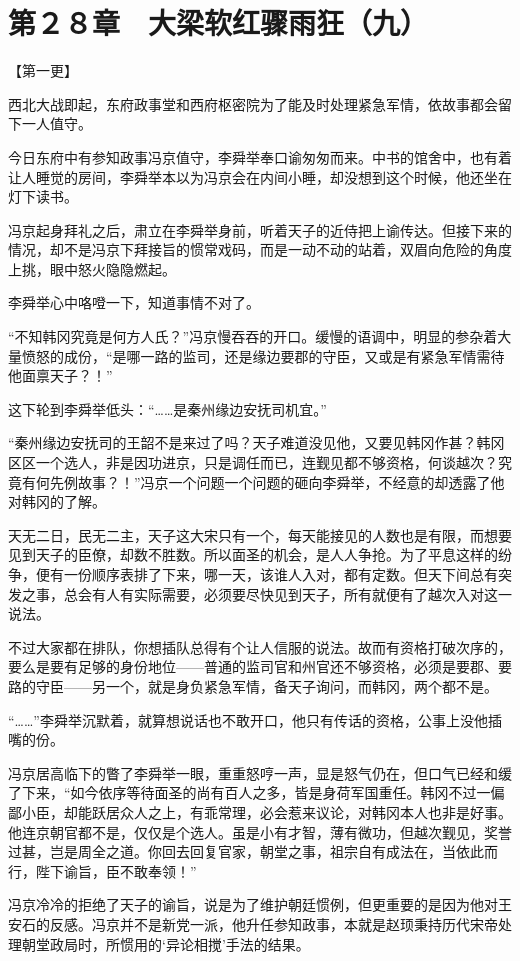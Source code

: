 \section{第２８章　大梁软红骤雨狂（九）}

【第一更】

西北大战即起，东府政事堂和西府枢密院为了能及时处理紧急军情，依故事都会留下一人值守。

今日东府中有参知政事冯京值守，李舜举奉口谕匆匆而来。中书的馆舍中，也有着让人睡觉的房间，李舜举本以为冯京会在内间小睡，却没想到这个时候，他还坐在灯下读书。

冯京起身拜礼之后，肃立在李舜举身前，听着天子的近侍把上谕传达。但接下来的情况，却不是冯京下拜接旨的惯常戏码，而是一动不动的站着，双眉向危险的角度上挑，眼中怒火隐隐燃起。

李舜举心中咯噔一下，知道事情不对了。

“不知韩冈究竟是何方人氏？”冯京慢吞吞的开口。缓慢的语调中，明显的参杂着大量愤怒的成份，“是哪一路的监司，还是缘边要郡的守臣，又或是有紧急军情需待他面禀天子？！”

这下轮到李舜举低头：“……是秦州缘边安抚司机宜。”

“秦州缘边安抚司的王韶不是来过了吗？天子难道没见他，又要见韩冈作甚？韩冈区区一个选人，非是因功进京，只是调任而已，连觐见都不够资格，何谈越次？究竟有何先例故事？！”冯京一个问题一个问题的砸向李舜举，不经意的却透露了他对韩冈的了解。

天无二日，民无二主，天子这大宋只有一个，每天能接见的人数也是有限，而想要见到天子的臣僚，却数不胜数。所以面圣的机会，是人人争抢。为了平息这样的纷争，便有一份顺序表排了下来，哪一天，该谁人入对，都有定数。但天下间总有突发之事，总会有人有实际需要，必须要尽快见到天子，所有就便有了越次入对这一说法。

不过大家都在排队，你想插队总得有个让人信服的说法。故而有资格打破次序的，要么是要有足够的身份地位——普通的监司官和州官还不够资格，必须是要郡、要路的守臣——另一个，就是身负紧急军情，备天子询问，而韩冈，两个都不是。

“……”李舜举沉默着，就算想说话也不敢开口，他只有传话的资格，公事上没他插嘴的份。

冯京居高临下的瞥了李舜举一眼，重重怒哼一声，显是怒气仍在，但口气已经和缓了下来，“如今依序等待面圣的尚有百人之多，皆是身荷军国重任。韩冈不过一偏鄙小臣，却能跃居众人之上，有乖常理，必会惹来议论，对韩冈本人也非是好事。他连京朝官都不是，仅仅是个选人。虽是小有才智，薄有微功，但越次觐见，奖誉过甚，岂是周全之道。你回去回复官家，朝堂之事，祖宗自有成法在，当依此而行，陛下谕旨，臣不敢奉领！”

冯京冷冷的拒绝了天子的谕旨，说是为了维护朝廷惯例，但更重要的是因为他对王安石的反感。冯京并不是新党一派，他升任参知政事，本就是赵顼秉持历代宋帝处理朝堂政局时，所惯用的‘异论相搅’手法的结果。

